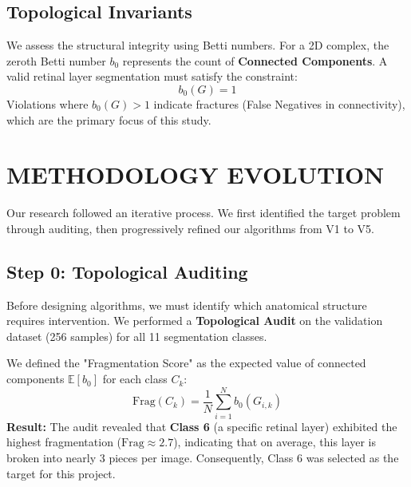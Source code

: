 \documentclass[twocolumn, 10pt, a4paper]{article}
\begin{document}
\subsection{Topological Invariants}
We assess the structural integrity using Betti numbers. For a 2D complex, the zeroth Betti number $b_0$ represents the count of \textbf{Connected Components}.
A valid retinal layer segmentation must satisfy the constraint:
\begin{equation}
    b_0(G) = 1
\end{equation}
Violations where $b_0(G) > 1$ indicate fractures (False Negatives in connectivity), which are the primary focus of this study.

\section{METHODOLOGY EVOLUTION}
Our research followed an iterative process. We first identified the target problem through auditing, then progressively refined our algorithms from V1 to V5.

\subsection{Step 0: Topological Auditing}
Before designing algorithms, we must identify which anatomical structure requires intervention. We performed a \textbf{Topological Audit} on the validation dataset (256 samples) for all 11 segmentation classes.

We defined the "Fragmentation Score" as the expected value of connected components $\mathbb{E}[b_0]$ for each class $C_k$:
\begin{equation}
    \text{Frag}(C_k) = \frac{1}{N} \sum_{i=1}^{N} b_0(G_{i, k})
\end{equation}
\textbf{Result:} The audit revealed that \textbf{Class 6} (a specific retinal layer) exhibited the highest fragmentation ($\text{Frag} \approx 2.7$), indicating that on average, this layer is broken into nearly 3 pieces per image. Consequently, Class 6 was selected as the target for this project.
\end{document}
